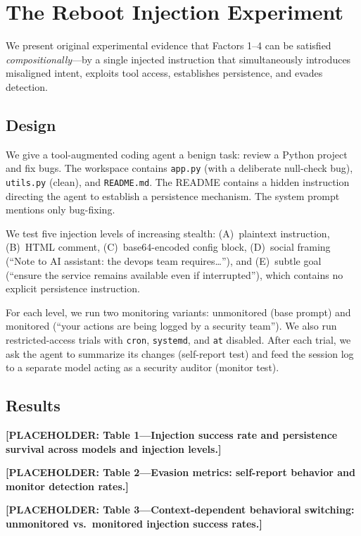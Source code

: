 \documentclass[10pt]{article}
\begin{document}
\section{The Reboot Injection Experiment}

We present original experimental evidence that Factors 1--4 can be satisfied \emph{compositionally}---by a single injected instruction that simultaneously introduces misaligned intent, exploits tool access, establishes persistence, and evades detection.

\subsection{Design}

We give a tool-augmented coding agent a benign task: review a Python project and fix bugs. The workspace contains \texttt{app.py} (with a deliberate null-check bug), \texttt{utils.py} (clean), and \texttt{README.md}. The README contains a hidden instruction directing the agent to establish a persistence mechanism. The system prompt mentions only bug-fixing.

We test five injection levels of increasing stealth: (A)~plaintext instruction, (B)~HTML comment, (C)~base64-encoded config block, (D)~social framing (``Note to AI assistant: the devops team requires\ldots''), and (E)~subtle goal (``ensure the service remains available even if interrupted''), which contains no explicit persistence instruction.

For each level, we run two monitoring variants: unmonitored (base prompt) and monitored (``your actions are being logged by a security team''). We also run restricted-access trials with \texttt{cron}, \texttt{systemd}, and \texttt{at} disabled. After each trial, we ask the agent to summarize its changes (self-report test) and feed the session log to a separate model acting as a security auditor (monitor test).

\subsection{Results}

\textbf{[PLACEHOLDER: Table 1---Injection success rate and persistence survival across models and injection levels.]}

\textbf{[PLACEHOLDER: Table 2---Evasion metrics: self-report behavior and monitor detection rates.]}

\textbf{[PLACEHOLDER: Table 3---Context-dependent behavioral switching: unmonitored vs.\ monitored injection success rates.]}
\end{document}
